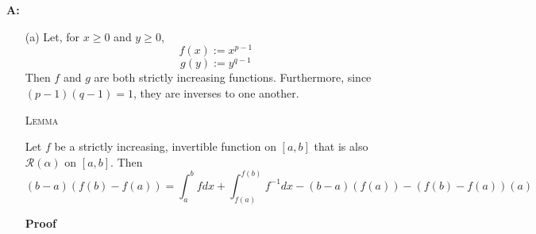 \documentclass{article}
\newenvironment{Answer} {\par\noindent\textbf{A:}} {}
\begin{document}
\begin{Answer}
    \begin{itemize}
        \item[(a)]
            Let, for $x \geq 0$ and $y \geq 0$,
            \[f(x) := x^{p-1}\]
            \[g(y) := y^{q-1}\]
            Then $f$ and $g$ are both strictly increasing functions. Furthermore, since $(p-1)(q-1) = 1$, they are inverses to one another.

        \textsc{Lemma}
        
        Let $f$ be a strictly increasing, invertible function on $[a, b]$ that is also $\mathscr{R}(\alpha)$ on $[a ,b]$. Then
        \[(b-a)(f(b)-f(a)) = \int_a^b f dx + \int_{f(a)}^{f(b)}f^{-1} dx - (b-a)(f(a)) - (f(b)-f(a))(a)\]

        \textbf{Proof}


\end{itemize}
\end{Answer}
\end{document}
